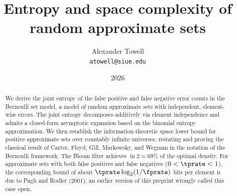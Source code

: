 \documentclass[11pt,final,hidelinks]{article}
\title
{
    Entropy and space complexity of random approximate sets
}
\author
{
    Alexander Towell\\
    \texttt{atowell@siue.edu}
}
\date{2026}
\numberwithin{equation}{section}
\begin{document}
\maketitle
\begin{abstract}
We derive the joint entropy of the false positive and false negative error counts in the Bernoulli set model, a model of random approximate sets with independent, element-wise errors.
The joint entropy decomposes additively via element independence and admits a closed-form asymptotic expansion based on the binomial entropy approximation.
We then establish the information-theoretic space lower bound for positive approximate sets over countably infinite universes, restating and proving the classical result of Carter, Floyd, Gill, Markowsky, and Wegman in the notation of the Bernoulli framework.
The Bloom filter achieves $\ln 2 \approx 69\%$ of the optimal density.
For approximate sets with both false positives and false negatives ($0 < \tprate < 1$), the corresponding bound of about $\tprate \log_2(1/\fprate)$ bits per element is due to Pagh and Rodler (2001); an earlier version of this preprint wrongly called this case open.
\end{abstract}



\tableofcontents
{}








\end{document}
